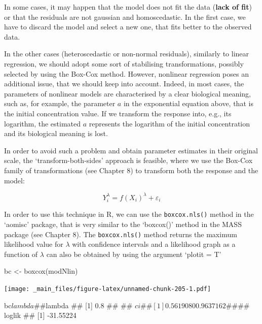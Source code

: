 \documentclass[a4paper,12pt,oneside]{book}
\newenvironment{Shaded}{\begin{snugshade}}{\end{snugshade}}
\newcommand{\SpecialCharTok}[1]{#1}
\newcommand{\DocumentationTok}[1]{#1}
\newcommand{\OtherTok}[1]{#1}
\newcommand{\FunctionTok}[1]{#1}
\newcommand{\NormalTok}[1]{#1}
\begin{document}
In some cases, it may happen that the model does not fit the data (\textbf{lack of fit}) or that the residuals are not gaussian and homoscedastic. In the first case, we have to discard the model and select a new one, that fits better to the observed data.

In the other cases (heteroscedastic or non-normal residuals), similarly to linear regression, we should adopt some sort of stabilising transformations, possibly selected by using the Box-Cox method. However, nonlinear regression poses an additional issue, that we should keep into account. Indeed, in most cases, the parameters of nonlinear models are characterised by a clear biological meaning, such as, for example, the parameter \(a\) in the exponential equation above, that is the initial concentration value. If we transform the response into, e.g., its logarithm, the estimated \(a\) represents the logarithm of the initial concentration and its biological meaning is lost.

In order to avoid such a problem and obtain parameter estimates in their original scale, the `transform-both-sides' approach is feasible, where we use the Box-Cox family of transformations (see Chapter 8) to transform both the response and the model:

\[Y_i^\lambda  = f(X_i)^\lambda + \varepsilon_i\]

In order to use this technique in R, we can use the \texttt{boxcox.nls()} method in the `aomisc' package, that is very similar to the `boxcox()' method in the MASS package (see Chapter 8). The \texttt{boxcox.nls()} method returns the maximum likelihood value for \(\lambda\) with confidence intervals and a likelihood graph as a function of \(\lambda\) can also be obtained by using the argument `plotit = T'

\vspace{12pt}

\begin{Shaded}
\begin{Highlighting}[]
\NormalTok{bc }\OtherTok{\textless{}{-}} \FunctionTok{boxcox}\NormalTok{(modNlin)}
\end{Highlighting}
\end{Shaded}

\texttt{[image: \_main\_files/figure-latex/unnamed-chunk-205-1.pdf]}

\begin{Shaded}
\begin{Highlighting}[]
\NormalTok{bc}\SpecialCharTok{$}\NormalTok{lambda}
\DocumentationTok{\#\# $lambda}
\DocumentationTok{\#\# [1] 0.8}
\DocumentationTok{\#\# }
\DocumentationTok{\#\# $ci}
\DocumentationTok{\#\# [1] 0.5619080 0.9637162}
\DocumentationTok{\#\# }
\DocumentationTok{\#\# $loglik}
\DocumentationTok{\#\# [1] {-}31.55224}
\end{Highlighting}
\end{Shaded}
\end{document}

